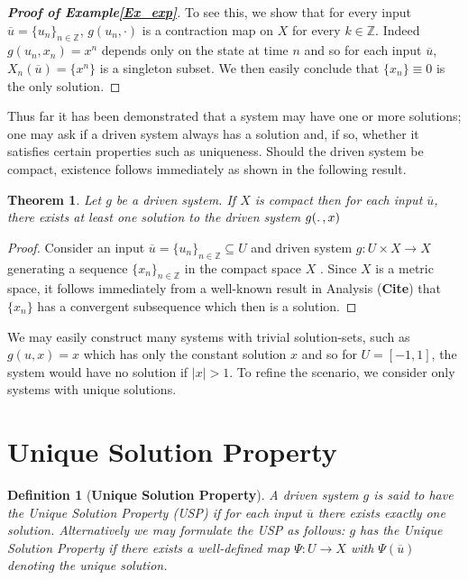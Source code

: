 \documentclass[a4paper,12pt,twoside]{book}
\newtheorem{Definition}{Definition}[]
\newtheorem{Theorem}{Theorem}[]
\begin{document}
\begin{proof}
  [\bf Proof of Example\ref{Ex_exp}] 
  To see this, we show that for every input $\overline{u}=\{u_n\}_{n\in\mathbb{Z}}$, $g(u_n,\cdot)$ is a contraction map on $X$ for every $k\in\mathbb{Z}$. 
  Indeed $g(u_n,x_n)=x^n$ depends only on the state at time $n$ and so for each input $\overline{u}$, $X_n(\overline{u})=\{x^n\}$ is a singleton subset.
  We then easily conclude that $\{x_n\}\equiv0$ is the only solution. 
\end{proof}

Thus far it has been demonstrated that a system may have one or more solutions; one may ask if a driven system always has a solution and, if so, whether it satisfies certain properties such as uniqueness. 
Should the driven system be compact, existence follows immediately as shown in the following result.

\begin{Theorem}\label{Thm_CompactExistence}
 Let $g$ be a driven system.  If $X$ is compact then for each input $\overline{u}$, there exists at least one solution to the driven system $g(\ldotp, x)$
\end{Theorem}
\begin{proof}
  Consider an input $\overline{u}={\{u_n\}}_{n\in\mathbb{Z}}\subseteq{U}$ and driven system $g:U\times{X}\to{X}$  generating a sequence ${\{x_n\}}_{n\in\mathbb{Z}}$ in the compact space $X$ . 
  Since $X$ is a metric space, it follows immediately from a well-known result in Analysis (\textbf{Cite}) that $\{x_n\}$ has a convergent subsequence which then is a solution.  
\end{proof}

We may easily construct many systems with trivial solution-sets, such as $g(u,x)=x$ which has only the constant solution $x$ and so for $U=[-1,1]$, the system would have no solution if $|x|>1$. To refine the scenario, we consider only systems with unique solutions. 

\section {Unique Solution Property}

\begin{Definition}
  [\bf Unique Solution Property] \label{Dfn_usp}
  A driven system $g$ is said to have the Unique Solution Property (USP) if for each input $\overline{u}$ there exists exactly one solution. 
  Alternatively we may formulate the USP as follows: $g$ has the Unique Solution Property if there exists a well-defined map $\Psi:{U}\to{X}$ with $\Psi({\overline{u}})$ denoting the unique solution.
\end{Definition}
\end{document}
